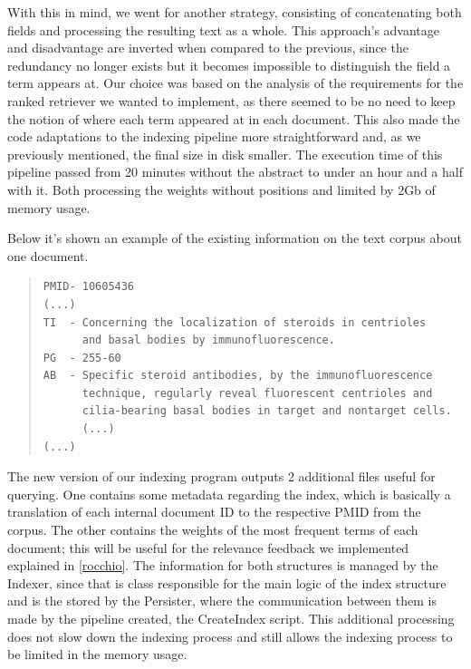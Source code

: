 \documentclass[12pt]{article}
\begin{document}
With this in mind, we went for another strategy, consisting of concatenating 
both fields and processing the resulting text as a whole.
This approach's advantage and disadvantage are inverted when compared to the 
previous, since the redundancy no longer exists but it becomes impossible to
distinguish the field a term appears at.
Our choice was based on the analysis of the requirements for the ranked retriever
we wanted to implement, as there seemed to be no need to keep the notion of where
each term appeared at in each document.
This also made the code adaptations to the indexing pipeline more straightforward 
and, as we previously mentioned, the final size in disk smaller.
The execution time of this pipeline passed from 20 minutes without the abstract to under an hour and a 
half with it. Both processing the weights without positions and limited by 2Gb of memory usage.

Below it's shown an example of the existing information on the text corpus about one document.

\begingroup
\addtolength\leftmargini{-0.4in}
\addtolength\baselineskip{-0.05in}
\begin{quote}
\begin{verbatim}
PMID- 10605436
(...)
TI  - Concerning the localization of steroids in centrioles
      and basal bodies by immunofluorescence.
PG  - 255-60
AB  - Specific steroid antibodies, by the immunofluorescence 
      technique, regularly reveal fluorescent centrioles and 
      cilia-bearing basal bodies in target and nontarget cells. 
      (...)
(...)
\end{verbatim}
\end{quote}
\endgroup
\vspace{-10pt}

\newpage
The new version of our indexing program outputs 2 additional files useful for 
querying.
One contains some metadata regarding the index, which is basically a 
translation of each internal document ID to the respective PMID from the corpus.
The other contains the weights of the most frequent terms of each document; this
will be useful for the relevance feedback we implemented explained in \ref{rocchio}.
The information for both structures is managed by the Indexer, since that is class responsible for the main logic of the index structure and is the stored by the Persister, where the communication between them is made by the pipeline created, the CreateIndex script. This additional processing does not slow down the indexing process and still allows the indexing process to be limited in the memory usage.  
\end{document}
